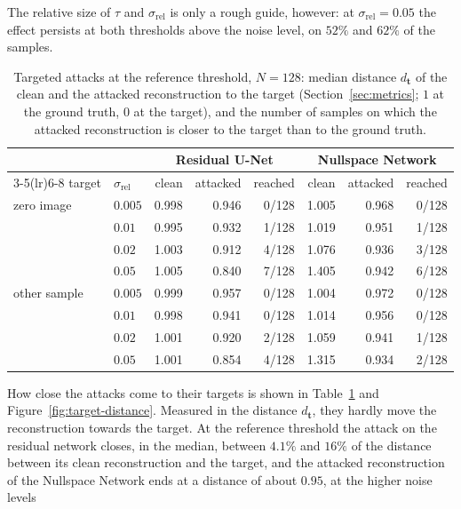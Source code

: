 \documentclass{article}
\numberwithin{equation}{section}
\begin{document}
The relative size of $\tau$ and $\sigma_\text{rel}$ is only a rough guide, however: at
$\sigma_\text{rel}=0.05$ the effect persists at both thresholds above the noise level, on $52\%$ and
$62\%$ of the samples.
\begin{table}[htbp]
\centering
\caption{Targeted attacks at the reference threshold, $N=128$: median
distance $d_\mathbf{t}$ of the clean and the attacked reconstruction to the target (Section~\ref{sec:metrics};
$1$ at the ground truth, $0$ at the target), and the number of samples on which the attacked
reconstruction is closer to the target than to the ground truth.}\label{tab:targeted}
\small\setlength{\tabcolsep}{4pt}
\begin{tabular}{l l rrr rrr}
\toprule
 & & \multicolumn{3}{c}{Residual U-Net} & \multicolumn{3}{c}{Nullspace Network} \\
\cmidrule(lr){3-5}\cmidrule(lr){6-8}
target & $\sigma_\text{rel}$ & clean & attacked & reached & clean & attacked & reached \\
\midrule
zero image     & $0.005$ & 0.998 & 0.946 & 0/128 & 1.005 & 0.968 & 0/128 \\
               & $0.01$  & 0.995 & 0.932 & 1/128 & 1.019 & 0.951 & 1/128 \\
               & $0.02$  & 1.003 & 0.912 & 4/128 & 1.076 & 0.936 & 3/128 \\
               & $0.05$  & 1.005 & 0.840 & 7/128 & 1.405 & 0.942 & 6/128 \\
\midrule
other sample   & $0.005$ & 0.999 & 0.957 & 0/128 & 1.004 & 0.972 & 0/128 \\
               & $0.01$  & 0.998 & 0.941 & 0/128 & 1.014 & 0.956 & 0/128 \\
               & $0.02$  & 1.001 & 0.920 & 2/128 & 1.059 & 0.941 & 1/128 \\
               & $0.05$  & 1.001 & 0.854 & 4/128 & 1.315 & 0.934 & 2/128 \\
\bottomrule
\end{tabular}
\end{table}
How close the attacks come to their targets is shown in Table~\ref{tab:targeted} and
Figure~\ref{fig:target-distance}. Measured in the distance $d_\mathbf{t}$, they hardly move the
reconstruction towards the target. At the reference threshold the attack on the residual network closes, in the median, between $4.1\%$
and $16\%$ of the distance between its clean reconstruction and the target, and the attacked
reconstruction of the Nullspace Network ends at a distance of about $0.95$, at the higher noise levels
\end{document}

